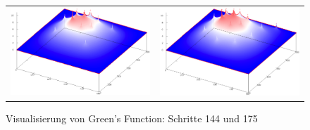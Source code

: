 \begin{refsection}
\begin{figure}
\begin{tabular}{cc}
\includegraphics[width=0.48\hsize]{green/images/resultate/np/step0144.png}
& \includegraphics[width=0.48\hsize]{green/images/resultate/np/step0175.png}
\end{tabular}		
\caption{Visualisierung von Green's Function: Schritte 144 und 175 }
\end{figure}

\printbibliography[heading=subbibliography]
\end{refsection}
